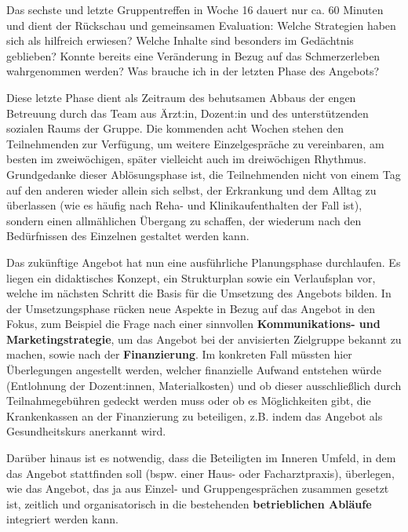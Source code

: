 \documentclass[
  twoside,
  parskip=half-,
  paper=176mm:246mm,
  BCOR=14mm,
  DIV=14,
]{scrreprt}
\begin{document}
Das sechste und letzte Gruppentreffen in Woche 16 dauert nur ca. 60 Minuten und dient der Rückschau und gemeinsamen Evaluation: Welche Strategien haben sich als hilfreich erwiesen? Welche Inhalte sind besonders im Gedächtnis geblieben? Konnte bereits eine Veränderung in Bezug auf das Schmerzerleben wahrgenommen werden? Was brauche ich in der letzten Phase des Angebots?

Diese letzte Phase dient als Zeitraum des behutsamen Abbaus der engen Betreuung durch das Team aus Ärzt:in, Dozent:in und des unterstützenden sozialen Raums der Gruppe. Die kommenden acht Wochen stehen den Teilnehmenden zur Verfügung, um weitere Einzelgespräche zu vereinbaren, am besten im zweiwöchigen, später vielleicht auch im dreiwöchigen Rhythmus. Grundgedanke dieser Ablösungsphase ist, die Teilnehmenden nicht von einem Tag auf den anderen wieder allein sich selbst, der Erkrankung und dem Alltag zu überlassen (wie es häufig nach Reha- und Klinikaufenthalten der Fall ist), sondern einen allmählichen Übergang zu schaffen, der wiederum nach den Bedürfnissen des Einzelnen gestaltet werden kann. 


Das zukünftige Angebot hat nun eine ausführliche Planungsphase durchlaufen. Es liegen ein didaktisches Konzept, ein Strukturplan sowie ein Verlaufsplan vor, welche im nächsten Schritt die Basis für die Umsetzung des Angebots bilden. In der Umsetzungsphase rücken neue Aspekte in Bezug auf das Angebot in den Fokus, zum Beispiel die Frage nach einer sinnvollen \textbf{Kommunikations- und Marketingstrategie}, um das Angebot bei der anvisierten Zielgruppe bekannt zu machen, sowie nach der \textbf{Finanzierung}. Im konkreten Fall müssten hier Überlegungen angestellt werden, welcher finanzielle Aufwand entstehen würde (Entlohnung der Dozent:innen, Materialkosten) und ob dieser ausschließlich durch Teilnahmegebühren gedeckt werden muss oder ob es Möglichkeiten gibt, die Krankenkassen an der Finanzierung zu beteiligen, z.B. indem das Angebot als Gesundheitskurs anerkannt wird. 

Darüber hinaus ist es notwendig, dass die Beteiligten im Inneren Umfeld, in dem das Angebot stattfinden soll (bspw. einer Haus- oder Facharztpraxis), überlegen, wie das Angebot, das ja aus Einzel- und Gruppengesprächen zusammen gesetzt ist, zeitlich und organisatorisch in die bestehenden \textbf{betrieblichen Abläufe} integriert werden kann. 
\end{document}
